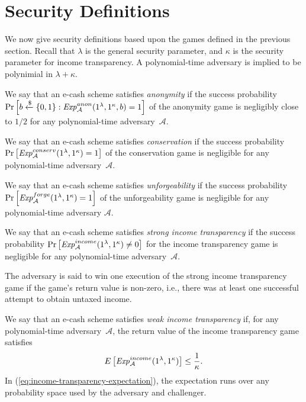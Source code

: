 \section{Security Definitions}\label{sec:security-properties}
We now give security definitions based upon the games defined in the previous
section.  Recall that $\lambda$ is the general security parameter, and $\kappa$ is the
security parameter for income transparency.  A polynomial-time adversary is implied to
be polynimial in $\lambda+\kappa$.

\begin{definition}[Anonymity]
  We say that an e-cash scheme satisfies \emph{anonymity} if the success
  probability $\Pr\left [b \xleftarrow{\text{\$}} \{0,1\}: \mathit{Exp}_{\cal A}^{anon}(1^\lambda,
  1^\kappa, b) = 1 \right ]$ of the anonymity game is negligibly close to $1/2$ for any
  polynomial-time adversary~$\mathcal{A}$.
\end{definition}

\begin{definition}[Conservation]
  We say that an e-cash scheme satisfies \emph{conservation} if
  the success probability $\Pr\left [\mathit{Exp}_{\cal A}^{conserv}(1^\lambda, 1^\kappa) = 1 \right ]$
  of the conservation game is negligible for any polynomial-time adversary~$\mathcal{A}$.
\end{definition}

\begin{definition}[Unforgeability]
  We say that an e-cash scheme satisfies \emph{unforgeability} if the success
  probability $\Pr\left [\mathit{Exp}_{\cal A}^{forge}(1^\lambda, 1^\kappa) = 1 \right ]$ of
  the unforgeability game is negligible for any polynomial-time adversary
  $\mathcal{A}$.
\end{definition}

\begin{definition}
  We say that an e-cash scheme satisfies \emph{strong income transparency} if
  the success probability $\Pr\left [\mathit{Exp}_{\cal A}^{income}(1^\lambda, 1^\kappa) \ne 0 \right ]$
  for the income transparency game is negligible for any polynomial-time adversary~$\mathcal{A}$.
\end{definition}
The adversary is said to win one execution of the strong income transparency
game if the game's return value is non-zero, i.e., there was at least one
successful attempt to obtain untaxed income.


\begin{definition}
  We say that an e-cash scheme satisfies \emph{weak income transparency}
  if, for any polynomial-time adversary~$\mathcal{A}$,
  the return value of the income transparency game satisfies
  \begin{equation}\label{eq:income-transparency-expectation}
    E\left[\mathit{Exp}_{\cal A}^{income}(1^\lambda, 1^\kappa)\right] \le {\frac{1}{\kappa}} .
  \end{equation}
  In (\ref{eq:income-transparency-expectation}), the expectation runs over 
  any probability space used by the adversary and challenger.
\end{definition}

